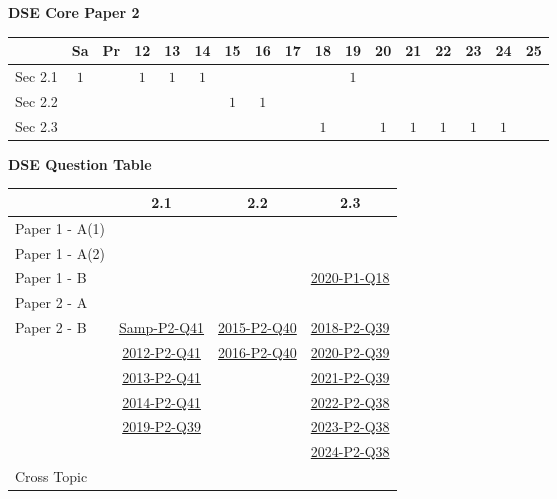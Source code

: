 \documentclass[12pt, a4paper]{article}
\begin{document}
\begin{absolutelynopagebreak}
\begin{center}
\textbf{DSE Core Paper 2}
\end{center}
\begin{center}
\begin{tabular}{|l|c|c|c|c|c|c|c|c|c|c|c|c|c|c|c|c|}
\hline
        & Sa & Pr & 12 & 13 & 14 & 15 & 16 & 17 & 18 & 19 & 20 & 21 & 22 & 23 & 24 & 25 \\\hline\hline
Sec 2.1 &  $1$ &  &  $1$ &  $1$ &  $1$ &  &  &  &  &  $1$ &  &  &  &  &  &  \\\hline
Sec 2.2 &  &  &  &  &  &  $1$ &  $1$ &  &  &  &  &  &  &  &  &  \\\hline
Sec 2.3 &  &  &  &  &  &  &  &  &  $1$ &  &  $1$ &  $1$ &  $1$ &  $1$ &  $1$ &  \\\hline
\end{tabular}
\end{center}
\end{absolutelynopagebreak}
\begin{absolutelynopagebreak}
\begin{center}
\textbf{DSE Question Table}
\end{center}
\begin{center}
\begin{tabular}{|l|c|c|c|}
\hline
        & 2.1 & 2.2 & 2.3 \\\hline
\hline
Paper 1 - A(1)&  &  &  \\
\hline
Paper 1 - A(2)&  &  &  \\
\hline
Paper 1 - B&  &  & \hyperref[DSE2020-CoreP1-Q18]{2020-P1-Q18} \\
\hline
\hline
Paper 2 - A&  &  &  \\
\hline
Paper 2 - B& \hyperref[DSE2012S-CoreP2-Q41]{Samp-P2-Q41} & \hyperref[DSE2015-CoreP2-Q40]{2015-P2-Q40} & \hyperref[DSE2018-CoreP2-Q39]{2018-P2-Q39} \\
& \hyperref[DSE2012-CoreP2-Q41]{2012-P2-Q41} & \hyperref[DSE2016-CoreP2-Q40]{2016-P2-Q40} & \hyperref[DSE2020-CoreP2-Q39]{2020-P2-Q39} \\
& \hyperref[DSE2013-CoreP2-Q41]{2013-P2-Q41} &  & \hyperref[DSE2021-CoreP2-Q39]{2021-P2-Q39} \\
& \hyperref[DSE2014-CoreP2-Q41]{2014-P2-Q41} &  & \hyperref[DSE2022-CoreP2-Q38]{2022-P2-Q38} \\
& \hyperref[DSE2019-CoreP2-Q39]{2019-P2-Q39} &  & \hyperref[DSE2023-CoreP2-Q38]{2023-P2-Q38} \\
&  &  & \hyperref[DSE2024-CoreP2-Q38]{2024-P2-Q38} \\
\hline
\hline
Cross Topic&  &  &  \\
\hline
\end{tabular}
\end{center}
\end{absolutelynopagebreak}
\end{document}
